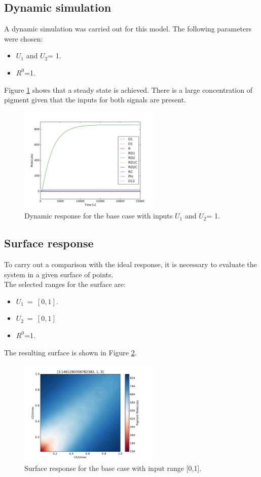 \documentclass[10pt]{article}
\begin{document}
\subsection{Dynamic simulation}
A dynamic simulation was carried out for this model. The following parameters were chosen:
\begin{itemize}
\item $U_1$ and $U_2$= 1. 
\item $R^0$=1.
\end{itemize}
Figure \ref{fig:dyn} shows that a steady state is achieved. There is a large concentration of pigment given that the inputs for both signals are present. 
\begin{figure}[h]
	\centering
	\includegraphics[width=0.6\textwidth]{Dynamic.pdf} 
	\caption{Dynamic response for the base case with inputs $U_1$ and $U_2$= 1.}\label{fig:dyn}
\end{figure}
 
\subsection{Surface response}
To carry out a comparison with the ideal response, it is necessary to evaluate the system in a given surface of points.\\
The selected ranges for the surface are: 
\begin{itemize}
\item $U_1~=~[0,1]$.
\item $U_2~=~[0,1]$
\item $R^0$=1.
\end{itemize}
The resulting surface is shown in Figure \ref{fig:surf}. 
\begin{figure}[h]
	\centering
	\includegraphics[width=0.6\textwidth]{Surface1.pdf} 
	\caption{Surface response for the base case with input range [0,1].}\label{fig:surf}
\end{figure}
\end{document}
